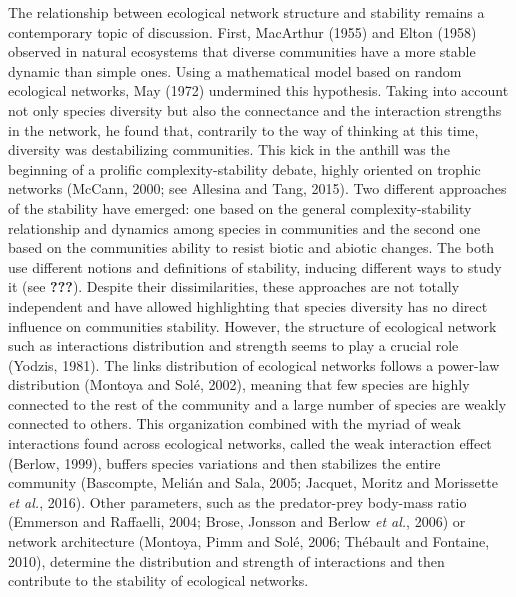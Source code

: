 \documentclass[12pt]{article}
\begin{document}
The relationship between ecological network structure and stability
remains a contemporary topic of discussion. First, MacArthur (1955) and
Elton (1958) observed in natural ecosystems that diverse communities
have a more stable dynamic than simple ones. Using a mathematical model
based on random ecological networks, May (1972) undermined this
hypothesis. Taking into account not only species diversity but also the
connectance and the interaction strengths in the network, he found that,
contrarily to the way of thinking at this time, diversity was
destabilizing communities. This kick in the anthill was the beginning of
a prolific complexity-stability debate, highly oriented on trophic
networks (McCann, 2000; see Allesina and Tang, 2015). Two different
approaches of the stability have emerged: one based on the general
complexity-stability relationship and dynamics among species in
communities and the second one based on the communities ability to
resist biotic and abiotic changes. The both use different notions and
definitions of stability, inducing different ways to study it (see
{\textbf{???}}). Despite their dissimilarities, these approaches are not
totally independent and have allowed highlighting that species diversity
has no direct influence on communities stability. However, the structure
of ecological network such as interactions distribution and strength
seems to play a crucial role (Yodzis, 1981). The links distribution of
ecological networks follows a power-law distribution (Montoya and Solé,
2002), meaning that few species are highly connected to the rest of the
community and a large number of species are weakly connected to others.
This organization combined with the myriad of weak interactions found
across ecological networks, called the weak interaction effect (Berlow,
1999), buffers species variations and then stabilizes the entire
community (Bascompte, Melián and Sala, 2005; Jacquet, Moritz and
Morissette \emph{et al.}, 2016). Other parameters, such as the
predator-prey body-mass ratio (Emmerson and Raffaelli, 2004; Brose,
Jonsson and Berlow \emph{et al.}, 2006) or network architecture
(Montoya, Pimm and Solé, 2006; Thébault and Fontaine, 2010), determine
the distribution and strength of interactions and then contribute to the
stability of ecological networks.
\end{document}
